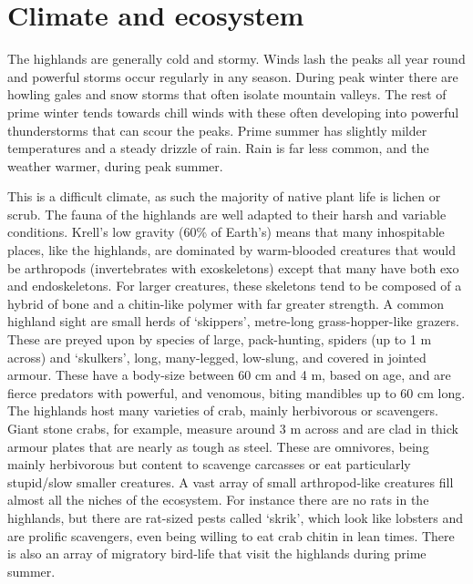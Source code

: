 \documentclass[a4paper,11pt,oneside]{book}
\begin{document}
\section{Climate and ecosystem}
The highlands are generally cold and stormy. Winds lash the peaks all year round and powerful storms occur regularly in any season. During peak winter there are howling gales and snow storms that often isolate mountain valleys. The rest of prime winter tends towards chill winds with these often developing into powerful thunderstorms that can scour the peaks. Prime summer has slightly milder temperatures and a steady drizzle of rain. Rain is far less common, and the weather warmer, during peak summer. 

This is a difficult climate, as such the majority of native plant life is lichen or scrub. The fauna of the highlands are well adapted to their harsh and variable conditions. Krell's low gravity (60\% of Earth's) means that many inhospitable places, like the highlands, are dominated by warm-blooded creatures that would be arthropods (invertebrates with exoskeletons) except that many have both exo and endoskeletons. For larger creatures, these skeletons tend to be composed of a hybrid of bone and a chitin-like polymer with far greater strength. A common highland sight are small herds of `skippers', metre-long grass-hopper-like grazers. These are preyed upon by species of large, pack-hunting, spiders (up to 1 m across) and `skulkers', long, many-legged, low-slung, and covered in jointed armour. These have a body-size between 60 cm and 4 m, based on age, and are fierce predators with powerful, and venomous, biting mandibles up to 60 cm long. The highlands host many varieties of crab, mainly herbivorous or scavengers. Giant stone crabs, for example, measure around 3 m across and are clad in thick armour plates that are nearly as tough as steel. These are omnivores, being mainly herbivorous but content to scavenge carcasses or eat particularly stupid/slow smaller creatures. A vast array of small arthropod-like creatures fill almost all the niches of the ecosystem. For instance there are no rats in the highlands, but there are rat-sized pests called `skrik', which look like lobsters and are prolific scavengers, even being willing to eat crab chitin in lean times. There is also an array of migratory bird-life that visit the highlands during prime summer. 
\end{document}
